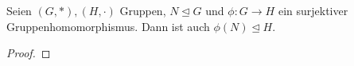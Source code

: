 \documentclass[../main.tex]{subfiles}
\begin{document}
\begin{lemma}\label{lem:found:5}
        Seien $(G,*), (H,\cdot)$ Gruppen, $N \trianglelefteq G$ und $\phi: G \rightarrow H$ ein surjektiver Gruppenhomomorphismus. Dann ist auch $\phi(N) \trianglelefteq H$.
\end{lemma}
    \begin{proof}
        \TODO
    \end{proof}
    
\end{document}
